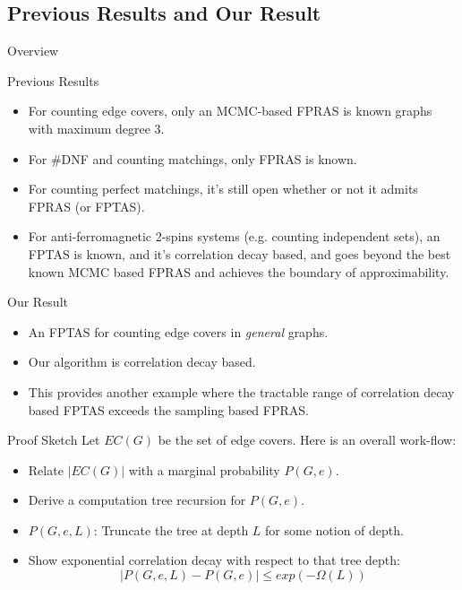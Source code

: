 \documentclass[mathserif]{beamer}
\newcommand{\abs}[1]{\left\vert#1\right\vert}
\begin{document}
\subsection{Previous Results and Our Result}
\begin{frame}{Overview}
	\tableofcontents[currentsubsection, hideothersubsections, sectionstyle=show/shaded, subsectionstyle=show/shaded]
\end{frame}
\begin{frame}{Previous Results}
	\begin{itemize}
		\item For counting edge covers, only an MCMC-based FPRAS is known graphs with maximum degree $3$.
			\pause
		\item For \#DNF and counting matchings, only FPRAS is known.
			\pause
		\item For counting perfect matchings, it's still open whether or not it admits FPRAS (or FPTAS).
			\pause
		\item For anti-ferromagnetic 2-spins systems (e.g. counting independent sets), an FPTAS is known, and it's correlation decay based, and goes beyond the best known MCMC based FPRAS and achieves the boundary of approximability.
	\end{itemize}

\end{frame}
\begin{frame}{Our Result}
	\begin{itemize}
		\item An FPTAS for counting edge covers in \emph{general} graphs.
		\item Our algorithm is correlation decay based.
		\item This provides another example where the tractable range of correlation decay based FPTAS exceeds the sampling based FPRAS.
	\end{itemize}
 
\end{frame}

\begin{frame}{Proof Sketch}
Let $EC(G)$ be the set of edge covers.
Here is an overall work-flow:
\begin{itemize}
  \item Relate $\abs{EC(G)}$ with a marginal probability $P(G,e)$.
  \item Derive a computation tree recursion for $P(G,e)$.
  \item $P(G,e,L)$: Truncate the tree at depth $L$ for some notion of depth.
  \item{ Show exponential correlation decay with respect to that tree depth:
  \[
    \abs{ P(G,e,L) - P(G,e) } \leq exp(-\Omega(L))
  \]}
\end{itemize}
\end{frame}
\end{document}
